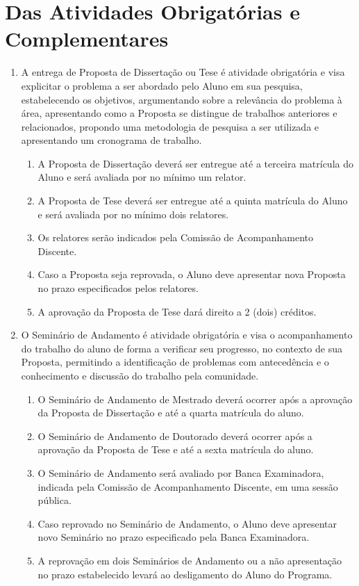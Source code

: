 \documentclass{article}
\begin{document}
\section{Das Atividades Obrigatórias e Complementares}
\begin{enumerate}

	\item  A entrega de Proposta de Dissertação ou Tese é atividade obrigatória e visa explicitar o problema a ser abordado pelo Aluno em sua pesquisa, estabelecendo os objetivos, argumentando sobre a relevância do problema à área, apresentando como a Proposta se distingue de trabalhos anteriores e relacionados, propondo uma metodologia de pesquisa a ser utilizada e apresentando um cronograma de trabalho.
	\begin{enumerate}
		\item A Proposta de Dissertação deverá ser entregue até a terceira matrícula do Aluno e será avaliada por no mínimo um relator.
		\item A Proposta de Tese deverá ser entregue até a quinta matrícula do Aluno e será avaliada por no mínimo dois relatores.
		\item Os relatores serão indicados pela Comissão de Acompanhamento Discente.
		\item Caso a Proposta seja reprovada, o Aluno deve apresentar nova Proposta no prazo especificados pelos relatores.
		\item A aprovação da Proposta de Tese dará direito a 2 (dois) créditos.
	\end{enumerate}

	\item O Seminário de Andamento é atividade obrigatória e visa o acompanhamento do trabalho do aluno de forma a verificar seu progresso, no contexto de sua Proposta, permitindo a identificação de problemas com antecedência e o conhecimento e discussão do trabalho pela comunidade.
	\begin{enumerate}
		\item O Seminário de Andamento de Mestrado deverá ocorrer após a aprovação da Proposta de Dissertação e até a quarta matrícula do aluno.
		\item O Seminário de Andamento de Doutorado deverá ocorrer após a aprovação da Proposta de Tese e até a sexta matrícula do aluno.
		\item O Seminário de Andamento será avaliado por Banca Examinadora, indicada pela Comissão de Acompanhamento Discente, em uma sessão pública.
		\item Caso reprovado no Seminário de Andamento, o Aluno deve apresentar novo Seminário no prazo especificado pela Banca Examinadora.
		\item A reprovação em dois Seminários de Andamento ou a não apresentação no prazo estabelecido levará ao desligamento do Aluno do Programa.
	\end{enumerate}


\end{enumerate}
\end{document}
